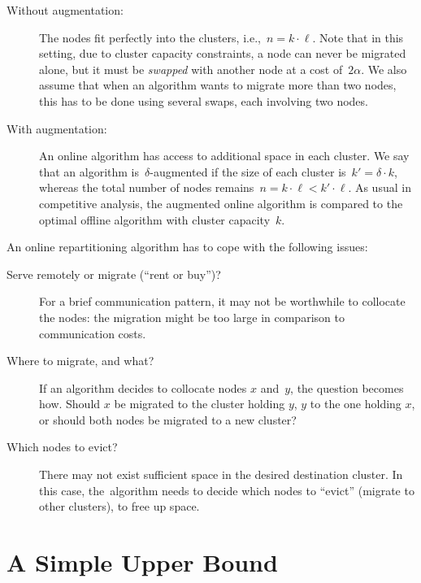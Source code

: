 \begin{description}

\item[Without augmentation:] The nodes fit perfectly into the clusters,
i.e.,~$n=k\cdot \ell$. Note that in this setting, due to cluster capacity
constraints, a node can never be migrated alone, but it must be \emph{swapped}
with another node at a cost of~$2\alpha$. We also assume that when an
algorithm wants to migrate more than two nodes, this has to be done using
several swaps, each involving two nodes.

\item[With augmentation:] An online algorithm has access to additional space
in each cluster. We say that an algorithm is~$\delta$-augmented if the size of
each cluster is~$k' = \delta \cdot k$, whereas the total number of nodes
remains~$n = k\cdot \ell < k'\cdot \ell$. As usual in competitive analysis,
the augmented online algorithm is compared to the optimal offline algorithm
with cluster capacity~$k$.
\end{description}

An online repartitioning algorithm has to cope with the following issues:

\begin{description}

\item[Serve remotely or migrate (``rent or buy'')?] For a brief communication
pattern, it may not be worthwhile to collocate the nodes: the migration might
be too large in comparison to communication costs.

\item[Where to migrate, and what?]
If an algorithm decides to collocate nodes $x$ and~$y$, the question becomes
how. Should $x$ be migrated to the cluster holding $y$, $y$ to the one holding
$x$, or should both nodes be migrated to a new cluster?

\item[Which nodes to evict?]
There may not exist sufficient space in the desired destination cluster. In
this case, the~algorithm needs to decide which nodes to ``evict'' (migrate to
other clusters), to free up space.

\end{description}

\section{A Simple Upper Bound}
\label{sec:upper}

